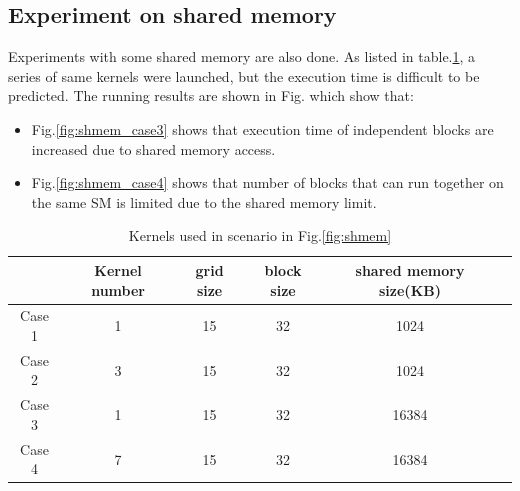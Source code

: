 \documentclass[conference]{IEEEtran}
\begin{document}
\subsection{Experiment on shared memory}
Experiments with some shared memory are also done. As listed in table.\ref{table:shmem_kernel}, a series of same kernels were launched, but the execution time is difficult to be predicted. The running results are shown in Fig. which show that:
\begin{itemize}
   \item Fig.\ref{fig:shmem_case3} shows that execution time of independent blocks are increased due to shared memory access.
   \item Fig.\ref{fig:shmem_case4} shows that number of blocks that can run together on the same SM is limited due to the shared memory limit.
\end{itemize}

\begin{table}[h]
   \caption{Kernels used in scenario in Fig.\ref{fig:shmem}}
   \centering
   \begin{tabular}{|c|c|c|c|c|c|}
   \hline
    & \bf Kernel number & \bf grid size & \bf block size & \bf shared memory size(KB) \\
    \hline
   Case 1 & 1 & 15 & 32 & 1024   \\
   Case 2 & 3 & 15 & 32 & 1024  \\ 
   Case 3 & 1 & 15 & 32 & 16384  \\
   Case 4 & 7 & 15 & 32 & 16384  \\
   \hline
   \end{tabular}
   \label{table:shmem_kernel}
\end{table}
\end{document}
